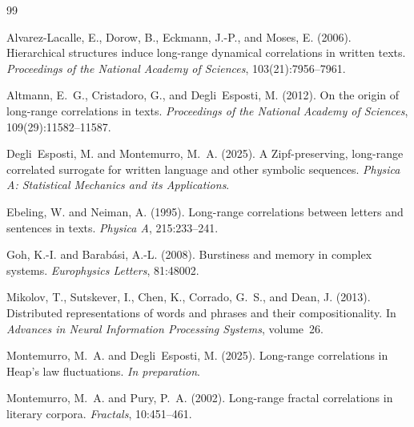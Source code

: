 \documentclass[12pt,a4paper]{article}
\begin{document}

\begin{thebibliography}{99}

Alvarez-Lacalle, E., Dorow, B., Eckmann, J.-P., and Moses, E. (2006).
\newblock Hierarchical structures induce long-range dynamical correlations in written texts.
\newblock \emph{Proceedings of the National Academy of Sciences},
  103(21):7956--7961.

Altmann, E.~G., Cristadoro, G., and Degli~Esposti, M. (2012).
\newblock On the origin of long-range correlations in texts.
\newblock \emph{Proceedings of the National Academy of Sciences},
  109(29):11582--11587.

Degli~Esposti, M. and Montemurro, M.~A. (2025).
\newblock A {Z}ipf-preserving, long-range correlated surrogate for
  written language and other symbolic sequences.
\newblock \emph{Physica A: Statistical Mechanics and its Applications}.

Ebeling, W. and Neiman, A. (1995).
\newblock Long-range correlations between letters and sentences in
  texts.
\newblock \emph{Physica A}, 215:233--241.

Goh, K.-I. and Barab{\'a}si, A.-L. (2008).
\newblock Burstiness and memory in complex systems.
\newblock \emph{Europhysics Letters}, 81:48002.

Mikolov, T., Sutskever, I., Chen, K., Corrado, G.~S., and Dean, J.
  (2013).
\newblock Distributed representations of words and phrases and their
  compositionality.
\newblock In \emph{Advances in Neural Information Processing Systems},
  volume~26.

Montemurro, M.~A. and Degli~Esposti, M. (2025).
\newblock Long-range correlations in {H}eap's law fluctuations.
\newblock \emph{In preparation}.

Montemurro, M.~A. and Pury, P.~A. (2002).
\newblock Long-range fractal correlations in literary corpora.
\newblock \emph{Fractals}, 10:451--461.


\end{thebibliography}
\end{document}
